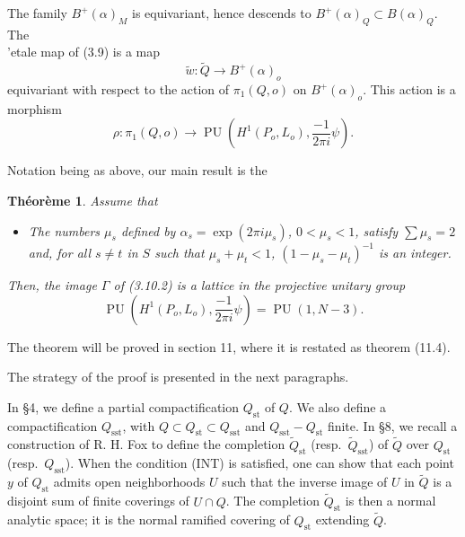 \documentclass[12pt,a4paper]{article}
\theoremstyle{plain}
\newtheorem{theorem}{Th\'eor\`eme}[section]
\theoremstyle{definition}
\theoremstyle{remark}
\DeclareMathOperator{\PU}{PU}
\numberwithin{equation}{section}
\begin{document}
The family $B^+(\alpha)_M$ is equivariant, hence descends to $B^+(\alpha)_Q \subset B(\alpha)_Q$. The \\'etale map of (3.9) is a map
\begin{equation}\label{eq:3.10.1}
\widetilde{w}: \widetilde{Q} \to B^+(\alpha)_o
\end{equation}
equivariant with respect to the action of $\pi_1(Q, o)$ on $B^+(\alpha)_o$. This action is a morphism
\begin{equation}\label{eq:3.10.2}
\rho: \pi_1(Q, o) \to \PU\left(H^1(P_o, L_o), \frac{-1}{2\pi i}\psi\right).
\end{equation}

Notation being as above, our main result is the
\begin{theorem}\label{thm:3.11}
Assume that
\begin{itemize}
\item[\emph{(INT)}] The numbers $\mu_s$ defined by $\alpha_s = \exp(2\pi i \mu_s)$, $0 < \mu_s < 1$, satisfy $\sum \mu_s = 2$ and, for all $s \neq t$ in $S$ such that $\mu_s + \mu_t < 1$, $(1 - \mu_s - \mu_t)^{-1}$ is an integer.
\end{itemize}
Then, the image $\Gamma$ of (3.10.2) is a lattice in the projective unitary group
\[
\PU\left(H^1(P_o, L_o), \frac{-1}{2\pi i}\psi\right) = \PU(1, N-3).
\]
\end{theorem}

The theorem will be proved in section 11, where it is restated as theorem (11.4).

The strategy of the proof is presented in the next paragraphs.

In \S 4, we define a partial compactification $Q_{\mathrm{st}}$ of $Q$. We also define a compactification $Q_{\mathrm{sst}}$, with $Q \subset Q_{\mathrm{st}} \subset Q_{\mathrm{sst}}$ and $Q_{\mathrm{sst}} - Q_{\mathrm{st}}$ finite. In \S 8, we recall a construction of R. H. Fox to define the completion $\widetilde{Q}_{\mathrm{st}}$ (resp.\ $\widetilde{Q}_{\mathrm{sst}}$) of $\widetilde{Q}$ over $Q_{\mathrm{st}}$ (resp.\ $Q_{\mathrm{sst}}$). When the condition (INT) is satisfied, one can show that each point $y$ of $Q_{\mathrm{st}}$ admits open neighborhoods $U$ such that the inverse image of $U$ in $\widetilde{Q}$ is a disjoint sum of finite coverings of $U \cap Q$. The completion $\widetilde{Q}_{\mathrm{st}}$ is then a normal analytic space; it is the normal ramified covering of $Q_{\mathrm{st}}$ extending $\widetilde{Q}$.
\end{document}
